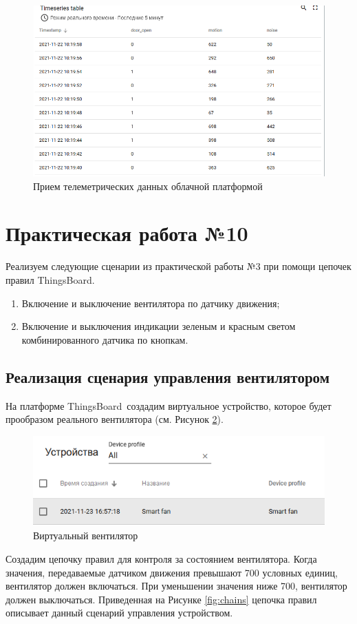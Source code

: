 \documentclass[a4paper,14pt]{extarticle}
\newcommand{\tb}{ThingsBoard~}
\begin{document}
\begin{figure}[h!]
	\centering
	\includegraphics[width=0.6\linewidth]{images/dop9-recieve}
	\caption{Прием телеметрических данных облачной платформой}
	\label{fig:dop9-recieve}
\end{figure}
\newpage
\section{Практическая работа №10}

Реализуем следующие сценарии из практической работы №3 при помощи цепочек правил ThingsBoard.

\begin{enumerate}
	\item Включение и выключение вентилятора по датчику движения;
	\item Включение и выключения индикации зеленым и красным светом комбинированного датчика по кнопкам.
\end{enumerate}

\subsection{Реализация сценария управления вентилятором}
На платформе \tb создадим виртуальное устройство, которое будет прообразом реального вентилятора (см. Рисунок \ref{fig:dev}).

\begin{figure}[h!]
	\centering
	\includegraphics[width=0.6\linewidth]{images/dev}
	\caption{Виртуальный вентилятор}
	\label{fig:dev}
\end{figure}

Создадим цепочку правил для контроля за состоянием вентилятора. Когда значения, передаваемые датчиком движения превышают 700 условных единиц, вентилятор должен включаться. При уменьшении значения ниже 700, вентилятор должен выключаться. Приведенная на Рисунке \ref{fig:chains} цепочка правил описывает данный сценарий управления устройством.
\end{document}
